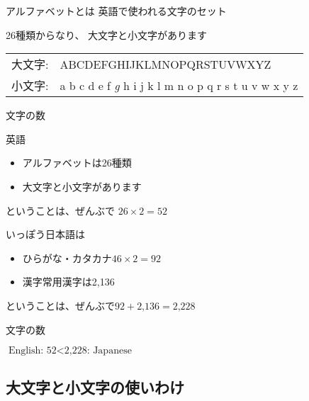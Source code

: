 \documentclass[aspectratio=169,xcolor={dvipsnames,table}]{beamer}
\begin{document}
\begin{frame}[plain,label=what_is_alphabet]{アルファベットとは}
\Large
\pause
英語で使われる文字のセット\pause

\bigskip

26種類からなり、\pause
大文字と小文字があります\pause

\begin{rmfamily}
\begin{tabular}{lp{}}
大文字:& ABCDEFGHIJKLMNOPQRSTUVWXYZ\\\pause
小文字:& a b c d e f {\itshape g} h i j k l m n o p q r s t u v w x y z
\end{tabular}

\end{rmfamily}

\end{frame}
\begin{frame}[plain]{文字の数}
\Large

英語\pause
\begin{itemize}[square]
 \item アルファベットは26種類\pause
 \item 大文字と小文字があります
\end{itemize}

\pause
\mbox{}\hfill{}ということは、ぜんぶで
$26\times{}2=52$

\pause
\bigskip

いっぽう日本語は\pause

\begin{itemize}[square]
 \item ひらがな・カタカナ\pause\mbox{}\hfill{}$46\times{}2=92$\pause
 \item 漢字\pause\mbox{}\hfill{}常用漢字は2,136
\end{itemize}

\pause

\mbox{}\hfill{}ということは、ぜんぶで$92+\text{2,136}=\text{2,228}$
\end{frame}
\begin{frame}[plain]{文字の数}
 \centering
 \Huge

$\text{English: 52}<\text{2,228: Japanese}$
\end{frame}
\subsection{大文字と小文字の使いわけ}
\end{document}
